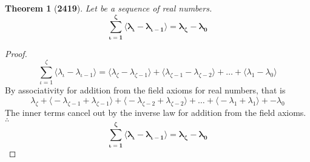 \documentclass[preview]{standalone}
\newtheorem*{theorem*}{Theorem}
\begin{document}
\begin{theorem*}[\textbf{2419}]
    Let \bm{$\{\lambda_\zeta\}$} be a sequence of real numbers.
    \begin{equation*}
        \bm{
            \sum_{\iota=1}^\zeta \big \langle 
                \lambda_\iota - \lambda_{\iota-1}
            \big \rangle
                = 
            \lambda_\zeta - \lambda_0
        }
    \end{equation*}
\end{theorem*}

\begin{proof}
    \begin{equation*}
        \sum_{\iota=1}^\zeta \big \langle
            \lambda_\iota - \lambda_{\iota-1}
        \big \rangle
            =
        \big \langle \lambda_\zeta - \lambda_{\zeta-1} \big \rangle 
            + 
        \big \langle \lambda_{\zeta-1} - \lambda_{\zeta-2} \big \rangle 
            + 
        \dots 
            + 
        \big \langle \lambda_1 - \lambda_0 \big \rangle
    \end{equation*}
    By associativity for addition from the field axioms for real numbers, that is 
    \begin{equation*}
        \lambda_\zeta 
            + 
        \big \langle -\lambda_{\zeta-1} + \lambda_{\zeta-1} \big \rangle
            + 
        \big \langle -\lambda_{\zeta-2} + \lambda_{\zeta-2} \big \rangle
            + 
        \dots 
            + 
        \big \langle -\lambda_1 + \lambda_1 \big \rangle
            + 
        -\lambda_0
    \end{equation*}
    The inner terms cancel out 
    by the inverse law for addition from the field axioms. 
    $\therefore$
    \begin{equation*}
        \bm{
            \sum_{\iota=1}^\zeta \big \langle 
                \lambda_\iota - \lambda_{\iota-1}
            \big \rangle
                = 
            \lambda_\zeta - \lambda_0
        }
    \end{equation*} 
\color{lightgray} \end{proof}
\end{document}
